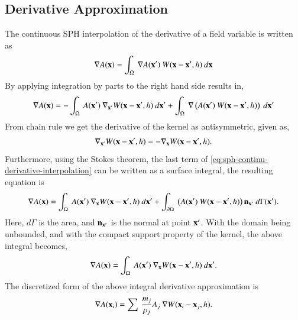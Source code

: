 \subsection{Derivative Approximation}
The continuous SPH interpolation of the derivative of a field variable is
written as
\begin{equation}
  \label{intro:eq:sph-continu-derivative-interpolation}
  \nabla A(\mathbf{x}) = \int_{\Omega}\> \nabla A(\mathbf{x}') \> W(\mathbf{x} - \mathbf{x}', h)  \> d\mathbf{x}
\end{equation}
By applying integration by parts to the right hand side results in,
\begin{equation}
  \label{eq:sph-continu-derivative-interpolation}
  \nabla A(\mathbf{x}) = - \int_{\Omega}\> A(\mathbf{x}') \> \nabla_{\mathbf{x}'} W(\mathbf{x} - \mathbf{x}', h)  \> d\mathbf{x}'
  + \int_{\Omega}\> \nabla \left( A(\mathbf{x}') \> W(\mathbf{x} - \mathbf{x}', h)\right)  \> d\mathbf{x}'
\end{equation}
From chain rule we get the derivative of the kernel as antisymmetric, given as,
\begin{equation}
  \label{intro:eq:sph-kernel-antisymmetric}
  \nabla_{\mathbf{x}'} W(\mathbf{x} - \mathbf{x}', h) = -\nabla_{\mathbf{x}} W(\mathbf{x} - \mathbf{x}', h).
\end{equation}
Furthermore, using the Stokes theorem, the last term of
\cref{eq:sph-continu-derivative-interpolation} can be written as a surface
integral, the resulting equation is
\begin{equation}
  \label{intro:eq:sph-continu-derivative-stokes}
  \nabla A(\mathbf{x}) = \int_{\Omega}\> A(\mathbf{x}') \> \nabla_{\mathbf{x}} W(\mathbf{x} - \mathbf{x}', h)  \> d\mathbf{x}' +
  \int_{\partial \Omega}\> \left( A(\mathbf{x}') \> W(\mathbf{x} - \mathbf{x}', h)\right) \mathbf{n}_{\mathbf{x}'} \> d\Gamma(\mathbf{x}').
\end{equation}
Here, $d\Gamma$ is the area, and $\mathbf{n}_{\mathbf{x}'}$ is the normal at
point $\mathbf{x}'$. With the domain being unbounded, and with the compact support
property of the kernel, the above integral becomes,
\begin{equation}
  \label{intro:eq:sph-continu-derivative-final}
  \nabla A(\mathbf{x}) = \int_{\Omega}\> A(\mathbf{x}') \> \nabla_{\mathbf{x}} W(\mathbf{x} - \mathbf{x}', h)  \> d\mathbf{x}'.
\end{equation}
The discretized form of the above integral derivative approximation is
\begin{equation}
  \label{intro:eq:derivative-discrete_form}
  \nabla A(\mathbf{x}_i) = \sum\> \frac{m_j}{\rho_j} A_j\> \nabla W(\mathbf{x}_i - \mathbf{x}_j, h).
\end{equation}

